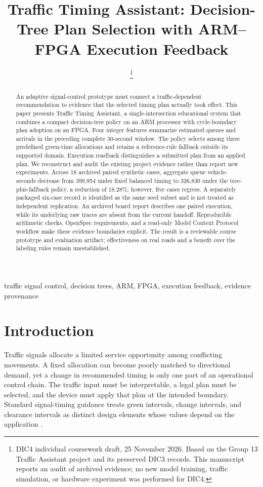\documentclass[conference]{IEEEtran}
\title{Traffic Timing Assistant: Decision-Tree Plan Selection with ARM--FPGA Execution Feedback}
\author{\IEEEauthorblockN{Po Sheng Wei}
\IEEEauthorblockA{IoT Data Analysis and Applications\\National Chung Hsing University, Taiwan}
\thanks{DIC4 individual coursework draft, 25 November 2026. Based on the Group 13 Traffic Assistant project and its preserved DIC3 records. This manuscript reports an audit of archived evidence; no new model training, traffic simulation, or hardware experiment was performed for DIC4.}}
\begin{document}
\maketitle

\begin{abstract}
An adaptive signal-control prototype must connect a traffic-dependent recommendation to evidence that the selected timing plan actually took effect. This paper presents Traffic Timing Assistant, a single-intersection educational system that combines a compact decision-tree policy on an ARM processor with cycle-boundary plan adoption on an FPGA. Four integer features summarize estimated queues and arrivals in the preceding complete 30-second window. The policy selects among three predefined green-time allocations and retains a reference-rule fallback outside its supported domain. Execution readback distinguishes a submitted plan from an applied plan. We reconstruct and audit the existing project evidence rather than report new experiments. Across 18 archived paired synthetic cases, aggregate queue vehicle-seconds decrease from 399,954 under fixed balanced timing to 326,830 under the tree-plus-fallback policy, a reduction of 18.28\%; however, five cases regress. A separately packaged six-case record is identified as the same seed subset and is not treated as independent replication. An archived board report describes one paired execution, while its underlying raw traces are absent from the current handoff. Reproducible arithmetic checks, OpenSpec requirements, and a read-only Model Context Protocol workflow make these evidence boundaries explicit. The result is a reviewable course prototype and evaluation artifact; effectiveness on real roads and a benefit over the labeling rules remain unestablished.
\end{abstract}
\begin{IEEEkeywords}
traffic signal control, decision trees, ARM, FPGA, execution feedback, evidence provenance
\end{IEEEkeywords}

\section{Introduction}
Traffic signals allocate a limited service opportunity among conflicting movements. A fixed allocation can become poorly matched to directional demand, yet a change in recommended timing is only one part of an operational control chain. The traffic input must be interpretable, a legal plan must be selected, and the device must apply that plan at the intended boundary. Standard signal-timing guidance treats green intervals, change intervals, and clearance intervals as distinct design elements whose values depend on the application \cite{koonce2008timing}.
\end{document}
